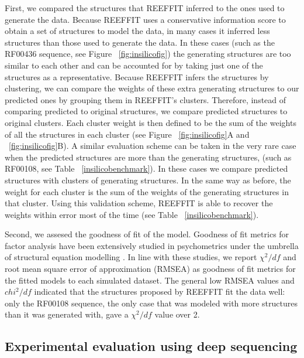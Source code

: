 \documentclass[12pt]{article}
\begin{document}
First, we compared the structures that REEFFIT inferred to the ones used to generate the data. Because REEFFIT uses a conservative information score to obtain a set of structures to model the data, in many cases it inferred less structures than those used to generate the data. In these cases (such as the RF00436 sequence, see Figure ~\ref{fig:insilicofig}) the generating structures are too similar to each other and can be accounted for by taking just one of the structures as a representative. Because REEFFIT infers the structures by clustering, we can compare the weights of these extra generating structures to our predicted ones by grouping them in REEFFIT's clusters. Therefore, instead of comparing predicted to original structures, we compare predicted structures to original clusters. Each cluster weight is then defined to be the sum of the weights of all the structures in each cluster (see Figure ~\ref{fig:insilicofig}A and ~\ref{fig:insilicofig}B). A similar evaluation scheme can be taken in the very rare case when the predicted structures are more than the generating structures, (such as RF00108, see Table ~\ref{insilicobenchmark}). In these cases we compare predicted structures with clusters of generating structures. In the same way as before, the weight for each cluster is the sum of the weights of the generating structures in that cluster. Using this validation scheme, REEFFIT is able to recover the weights within error most of the time (see Table ~\ref{insilicobenchmark}).

Second, we assesed the goodness of fit of the model. Goodness of fit metrics for factor analysis have been extensively studied in psychometrics under the umbrella of structural equation modelling \cite{Schreiber2006,Marsh1988,Babyak2010}. In line with these studies, we report $\chi^2/df$ and root mean square error of approximation (RMSEA) as goodness of fit metrics for the fitted models to each simulated dataset. The general low RMSEA values and $chi^2/df$ indicated that the structures proposed by REEFFIT fit the data well: only the RF00108 sequence, the only case that was modeled with more structures than it was generated with, gave a $\chi^2/df$ value over 2.    

\subsection{Experimental evaluation using deep sequencing}
\end{document}
